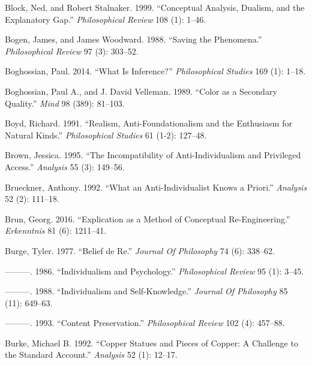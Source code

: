 \documentclass[
  10pt,
  letterpaper,
  DIV=11,
  numbers=noendperiod,
  twoside]{scrartcl}
\newlength{\cslhangindent}
\newenvironment{CSLReferences}[2] %
 {\begin{list}{}{%
  \setlength{\itemindent}{0pt}
  \setlength{\leftmargin}{0pt}
  \setlength{\parsep}{0pt}
  \ifodd #1
   \setlength{\leftmargin}{\cslhangindent}
   \setlength{\itemindent}{-1\cslhangindent}
  \fi
  \setlength{\itemsep}{#2\baselineskip}}}
 {\end{list}}
\begin{document}
\begin{CSLReferences}{1}{0}
Block, Ned, and Robert Stalnaker. 1999. {``Conceptual Analysis, Dualism,
and the Explanatory Gap.''} \emph{Philosophical Review} 108 (1): 1--46.

Bogen, James, and James Woodward. 1988. {``Saving the Phenomena.''}
\emph{Philosophical Review} 97 (3): 303--52.

Boghossian, Paul. 2014. {``What Is Inference?''} \emph{Philosophical
Studies} 169 (1): 1--18.

Boghossian, Paul A., and J. David Velleman. 1989. {``Color as a
Secondary Quality.''} \emph{Mind} 98 (389): 81--103.

Boyd, Richard. 1991. {``Realism, Anti-Foundationalism and the Enthusiasm
for Natural Kinds.''} \emph{Philosophical Studies} 61 (1-2): 127--48.

Brown, Jessica. 1995. {``The Incompatibility of Anti-Individualism and
Privileged Access.''} \emph{Analysis} 55 (3): 149--56.

Brueckner, Anthony. 1992. {``What an Anti-Individualist Knows a
Priori.''} \emph{Analysis} 52 (2): 111--18.

Brun, Georg. 2016. {``Explication as a Method of Conceptual
Re-Engineering.''} \emph{Erkenntnis} 81 (6): 1211--41.

Burge, Tyler. 1977. {``Belief de Re.''} \emph{Journal Of Philosophy} 74
(6): 338--62.

---------. 1986. {``Individualism and Psychology.''} \emph{Philosophical
Review} 95 (1): 3--45.

---------. 1988. {``Individualism and Self-Knowledge.''} \emph{Journal
Of Philosophy} 85 (11): 649--63.

---------. 1993. {``Content Preservation.''} \emph{Philosophical Review}
102 (4): 457--88.

Burke, Michael B. 1992. {``Copper Statues and Pieces of Copper: A
Challenge to the Standard Account.''} \emph{Analysis} 52 (1): 12--17.


\end{CSLReferences}
\end{document}
